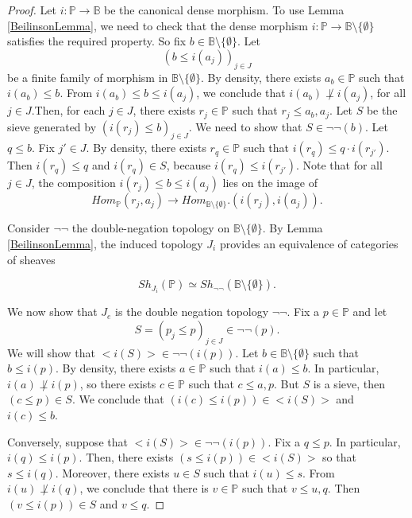 \documentclass[10pt,a4paper]{amsart}
\newcommand{\Po}{\mathbb{P}}
\newcommand{\B}{\mathbb{B}}
\begin{document}
\begin{proof}
	Let $i: \Po \to \B$ be the canonical dense morphism. To use Lemma \ref{BeilinsonLemma}, we need to check that the dense morphism $i: \Po \to \B \setminus \{\emptyset\}$ satisfies the required property. So fix $b \in \B \setminus \{\emptyset\}$. Let $$(b \leq  i(a_{j}))_{j \in J}$$ be a finite family of morphism in $\B \setminus \{\emptyset\}$. By density, there exists $a_{b} \in \Po$ such that $i(a_{b})  \leq b$. From $i(a_{b}) \leq b \leq i(a_{j})$, we conclude that $i(a_{b}) \not \perp i(a_{j})$, for all $j \in J$.Then, for each $j \in J$, there exists $r_{j} \in \Po$ such that $r_{j} \leq a_{b}, a_{j}$. Let $S$ be the sieve generated by $(i(r_{j}) \leq b)_{j \in J}$. We need to show that $S \in \neg \neg (b)$. Let $q \leq b$. Fix $j' \in J$. By density, there exists $r_{q} \in \Po$ such that $i(r_{q}) \leq q \cdot i(r_{j'})$. Then $i(r_{q}) \leq q$ and $i(r_{q}) \in S$, because $i(r_{q}) \leq i(r_{j'})$. Note that for all $j \in J$, the composition $i(r_{j}) \leq b \leq i(a_{j})$ lies on the image of 
	$$Hom_{\Po}(r_{j},a_{j}) \to Hom_{\B \setminus \{\emptyset\}}.(i(r_{j}),i(a_{j})).$$
	
	Consider $\neg \neg$ the double-negation topology on $\B \setminus \{\emptyset\}$. By Lemma \ref{BeilinsonLemma}, the induced topology $J_{i}$ provides an equivalence of categories of sheaves
	
	$$Sh_{J_{i}}(\Po) \simeq Sh_{\neg \neg}(\B \setminus \{ \emptyset \}).$$
	
	We now show that $J_{e}$ is the double negation topology $\neg \neg$. Fix a $p \in \Po$ and let $$S = (p_{j} \leq p)_{j \in J} \in \neg \neg(p).$$ We will show that  $<i(S)> \in \neg \neg (i(p))$. Let $b \in \B \setminus \{\emptyset\}$ such that $b \leq i(p)$. By density, there exists $a \in \Po$ such that $i(a) \leq b$. In particular, $i(a)\not \perp i(p)$, so there exists $c \in \Po$ such that $c \leq a,p	$. But $S$ is a sieve, then $ (c \leq p) \in S$. We conclude that $(i(c)\leq i(p)) \in <i(S)>$ and $i(c) \leq b.$
	
	Conversely, suppose that $<i(S)> \in \neg \neg (i(p))$. Fix a $q \leq p$. In particular, $i(q) \leq i(p)$. Then, there exists $(s \leq i(p)) \in <i(S)>$ so that $s \leq i(q)$. Moreover, there exists $u \in S$ such that $i(u) \leq s$. From $i(u) \not \perp i(q)$, we conclude that there is $v \in \Po$ such that $v \leq u,q$. Then $(v\leq i(p)) \in S$ and $v\leq q$.
\end{proof}
\end{document}

